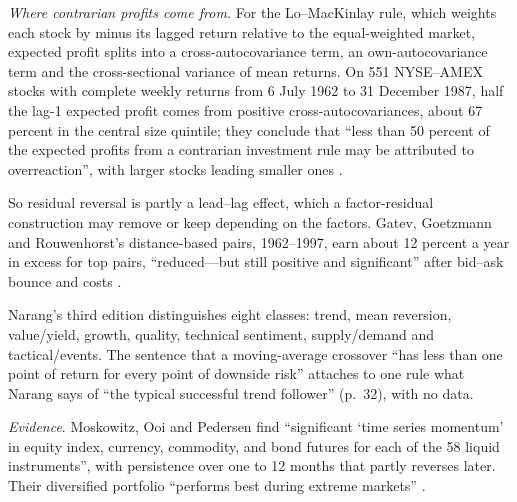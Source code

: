 \begin{qfdefinition}
\begin{itemize}
\emph{Where contrarian profits come from.} For the Lo--MacKinlay rule, which weights each stock by minus its lagged return relative to the equal-weighted market, expected profit splits into a cross-autocovariance term, an own-autocovariance term and the cross-sectional variance of mean returns. On 551 NYSE--AMEX stocks with complete weekly returns from 6 July 1962 to 31 December 1987, half the lag-1 expected profit comes from positive cross-autocovariances, about 67 percent in the central size quintile; they conclude that ``less than 50 percent of the expected profits from a contrarian investment rule may be attributed to overreaction'', with larger stocks leading smaller ones \citep[NBER WP~2977, May 1989, sec.~4, printed p.~17, and sec.~6, printed p.~22]{wide-lo-mackinlay-contrarian}.

So residual reversal is partly a lead--lag effect, which a factor-residual construction may remove or keep depending on the factors. Gatev, Goetzmann and Rouwenhorst's distance-based pairs, 1962--1997, earn about 12 percent a year in excess for top pairs, ``reduced---but still positive and significant'' after bid--ask bounce and costs \citep[NBER WP 7032, 1999, sec.~I, p.~1]{alpha-gatev}.
\end{itemize}

 Narang's third edition distinguishes eight classes: trend, mean reversion, value/yield, growth, quality, technical sentiment, supply/demand and tactical/events. The sentence that a moving-average crossover ``has less than one point of return for every point of downside risk'' attaches to one rule what Narang says of ``the typical successful trend follower'' (p.~32), with no data.

\emph{Evidence}. Moskowitz, Ooi and Pedersen find ``significant `time series momentum' in equity index, currency, commodity, and bond futures for each of the 58 liquid instruments'', with persistence over one to 12 months that partly reverses later. Their diversified portfolio ``performs best during extreme markets'' \citep[abstract, p.~228]{s6-tsmom}.


\end{qfdefinition}
